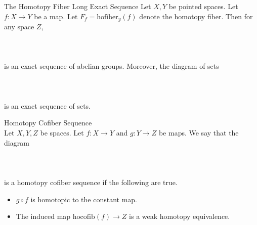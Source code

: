 \documentclass[a4paper]{article}
\begin{document}
\begin{thm}{The Homotopy Fiber Long Exact Sequence}{} Let $X,Y$ be pointed spaces. Let $f:X\to Y$ be a map. Let $F_f=\text{hofiber}_y(f)$ denote the homotopy fiber. Then for any space $Z$, \\~\\
\\~\\
is an exact sequence of abelian groups. Moreover, the diagram of sets \\~\\
\\~\\
is an exact sequence of sets. 
\end{thm}

\begin{defn}{Homotopy Cofiber Sequence}{}\\
Let $X,Y,Z$ be spaces. Let $f:X\to Y$ and $g:Y\to Z$ be maps. We say that the diagram \\~\\
\\~\\
is a homotopy cofiber sequence if the following are true. 
\begin{itemize}
\item $g\circ f$ is homotopic to the constant map. 
\item The induced map $\text{hocofib}(f)\to Z$ is a weak homotopy equivalence. 
\end{itemize}
\end{defn}
\end{document}
